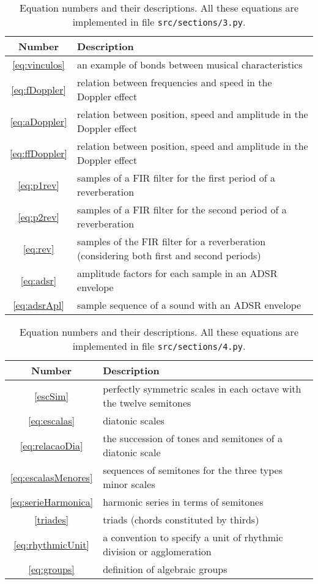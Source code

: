 \documentclass{scrreprt}
\begin{document}
\begin{table*}[htp!]
\centering
\caption{Equation numbers and their descriptions.
All these equations are implemented in file \texttt{src/sections/3.py}.}
\begin{tabular}{ c | p{12cm} }
   Number & Description \\\hline
 \ref{eq:vinculos} & an example of bonds between musical characteristics \\
 \ref{eq:fDoppler} & relation between frequencies and speed in the Doppler effect \\
 \ref{eq:aDoppler} & relation between position, speed and amplitude in the Doppler effect \\
 \ref{eq:ffDoppler} & relation between position, speed and amplitude in the Doppler effect \\
 \ref{eq:p1rev} & samples of a FIR filter for the first period of a reverberation \\
 \ref{eq:p2rev} & samples of a FIR filter for the second period of a reverberation \\
 \ref{eq:rev} & samples of the FIR filter for a reverberation (considering both first and second periods) \\
 \ref{eq:adsr} & amplitude factors for each sample in an ADSR envelope \\
 \ref{eq:adsrApl} & sample sequence of a sound with an ADSR envelope \\
\end{tabular}
\end{table*}

\begin{table*}[htp!]
\centering
\caption{Equation numbers and their descriptions.
All these equations are implemented in file \texttt{src/sections/4.py}.}
\begin{tabular}{ c | p{12cm} }
   Number & Description \\\hline
 \ref{escSim} & perfectly symmetric scales in each octave with the twelve semitones \\
 \ref{eq:escalas} & diatonic scales \\
 \ref{eq:relacaoDia} & the succession of tones and semitones of a diatonic scale \\
 \ref{eq:escalasMenores} & sequences of semitones for the three types minor scales \\
 \ref{eq:serieHarmonica} & harmonic series in terms of semitones \\
 \ref{triades} & triads (chords constituted by thirds) \\
 \ref{eq:rhythmicUnit} & a convention to specify a unit of rhythmic division or agglomeration \\
 \ref{eq:groups} & definition of algebraic groups \\
\end{tabular}
\end{table*}
\end{document}
